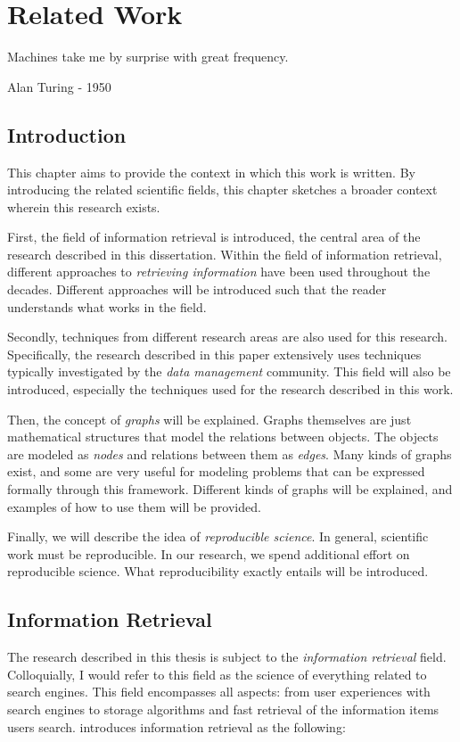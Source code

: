 \chapter{Related Work}
\label{related-work}

\epigraph{Machines take me by surprise with great frequency.}{Alan Turing - 1950}

\section{Introduction}
This chapter aims to provide the context in which this work is written. By introducing the related scientific fields, this chapter sketches a broader context wherein this research exists. 

First, the field of information retrieval is introduced, the central area of the research described in this dissertation. Within the field of information retrieval, different approaches to \emph{retrieving information} have been used throughout the decades. Different approaches will be introduced such that the reader understands what works in the field.

Secondly, techniques from different research areas are also used for this research. Specifically, the research described in this paper extensively uses techniques typically investigated by the \emph{data management} community. This field will also be introduced, especially the techniques used for the research described in this work. 

Then, the concept of \emph{graphs} will be explained. Graphs themselves are just mathematical structures that model the relations between objects. The objects are modeled as \emph{nodes} and relations between them as \emph{edges}. Many kinds of graphs exist, and some are very useful for modeling problems that can be expressed formally through this framework. Different kinds of graphs will be explained, and examples of how to use them will be provided.

Finally, we will describe the idea of \emph{reproducible science}. In general, scientific work must be reproducible. In our research, we spend additional effort on reproducible science. What reproducibility exactly entails will be introduced.  

\section{Information Retrieval}
The research described in this thesis is subject to the \emph{information retrieval} field. Colloquially, I would refer to this field as the science of everything related to search engines. This field encompasses all aspects: from user experiences with search engines to storage algorithms and fast retrieval of the information items users search.  introduces information retrieval as the following:

